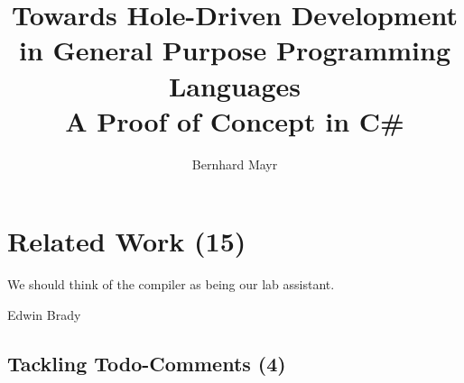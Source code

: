 \documentclass[master,english,smartquotes]{hgbthesis}
\begin{document}


\title{%
  Towards Hole-Driven Development in General Purpose Programming Languages \\
  \large A Proof of Concept in C\#}
\author{Bernhard Mayr}





\frontmatter                                   %

\maketitle
\tableofcontents

\listoftodos




\mainmatter                                    %



\chapter{Related Work (15)}
\epigraph{We should think of the compiler as being our lab assistant.}{Edwin Brady}
\section{Tackling Todo-Comments (4)}
\end{document}
